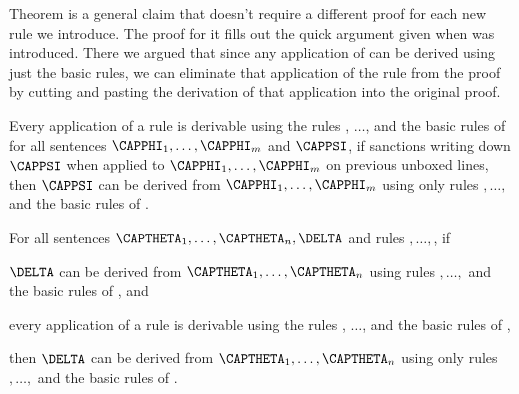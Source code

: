 Theorem  is a general claim that doesn't require a different proof for each new rule we introduce. 
The proof for it fills out the quick argument given when  was introduced. There we argued that since any application of  can be derived using just the basic rules, we can eliminate that application of the rule from the proof by cutting and pasting the derivation of that application into the original proof. 
\begin{majorILnc}{}
Every application of a rule  is derivable using the rules , $\ldots$,  and the basic rules of \GSD{} \Iff for all \GSL{} sentences $\CAPPHI_1,\ldots,\CAPPHI_{\integer{m}}$ and $\CAPPSI$, if  sanctions writing down $\CAPPSI$ when applied to $\CAPPHI_1,\ldots,\CAPPHI_{\integer{m}}$ on previous unboxed lines, then $\CAPPSI$ can be derived from $\CAPPHI_1,\ldots,\CAPPHI_{\integer{m}}$ using only rules $,\ldots,$ and the basic rules of \GSD{}.
\end{majorILnc}
\begin{THEOREM}{}
For all \GSL{} sentences $\CAPTHETA_1,\ldots,\CAPTHETA_{\integer{n}},\DELTA$ and rules $,\ldots,$, if
\begin{cenumerate}
\item $\DELTA$ can be derived from $\CAPTHETA_1,\ldots,\CAPTHETA_{\integer{n}}$ using rules $,\ldots,$ and the basic rules of \GSD{}, and
\item every application of a rule  is derivable using the rules , $\ldots$,  and the basic rules of \GSD{},
\end{cenumerate}
then $\DELTA$ can be derived from $\CAPTHETA_1,\ldots,\CAPTHETA_{\integer{n}}$ using only rules $,\ldots,$ and the basic rules of \GSD{}.
\end{THEOREM}
